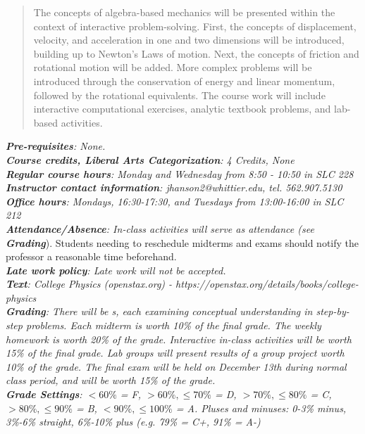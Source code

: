 \documentclass[10pt]{article}
\begin{document}
\maketitle

\begin{abstract}
The concepts of algebra-based mechanics will be presented within the context of interactive problem-solving.  First, the concepts of displacement, velocity, and acceleration in one and two dimensions will be introduced, building up to Newton's Laws of motion.  Next, the concepts of friction and rotational motion will be added.  More complex problems will be introduced through the conservation of energy and linear momentum, followed by the rotational equivalents.  The course work will include interactive computational exercises, analytic textbook problems, and lab-based activities.
\end{abstract}
\noindent
\textit{\textbf{Pre-requisites}: None.} \\
\textit{\textbf{Course credits, Liberal Arts Categorization}: 4 Credits, None} \\
\textit{\textbf{Regular course hours}: Monday and Wednesday from 8:50 - 10:50 in SLC 228} \\
\textit{\textbf{Instructor contact information}: jhanson2@whittier.edu, tel. 562.907.5130} \\
\textit{\textbf{Office hours}: Mondays, 16:30-17:30, and Tuesdays from 13:00-16:00 in SLC 212} \\
\textit{\textbf{Attendance/Absence}: In-class activities will serve as attendance (see \textit{\textbf{Grading}}}).  Students needing to reschedule midterms and exams should notify the professor a reasonable time beforehand. \\
\textit{\textbf{Late work policy}: Late work will not be accepted.} \\
\textit{\textbf{Text}: College Physics (openstax.org) -  https://openstax.org/details/books/college-physics} \\
\textit{\textbf{Grading}: There will be s, each examining conceptual understanding in step-by-step problems.  Each midterm is worth 10\% of the final grade.  The weekly homework is worth 20\% of the grade.  Interactive in-class activities will be worth 15\% of the final grade.  Lab groups will present results of a group project worth 10\% of the grade.  The final exam will be held on December 13th during normal class period, and will be worth 15\% of the grade.} \\
\textit{\textbf{Grade Settings}: $<60\%$ = F, $>60\%,\leq 70\%$ = D, $>70\%,\leq80\%$ = C, $>80\%,\leq 90\%$ = B, $<90\%,\leq 100\%$ = A.  Pluses and minuses: 0-3\% minus, 3\%-6\% straight, 6\%-10\% plus (e.g. 79\% = C+, 91\% = A-)} \\
\end{document}
